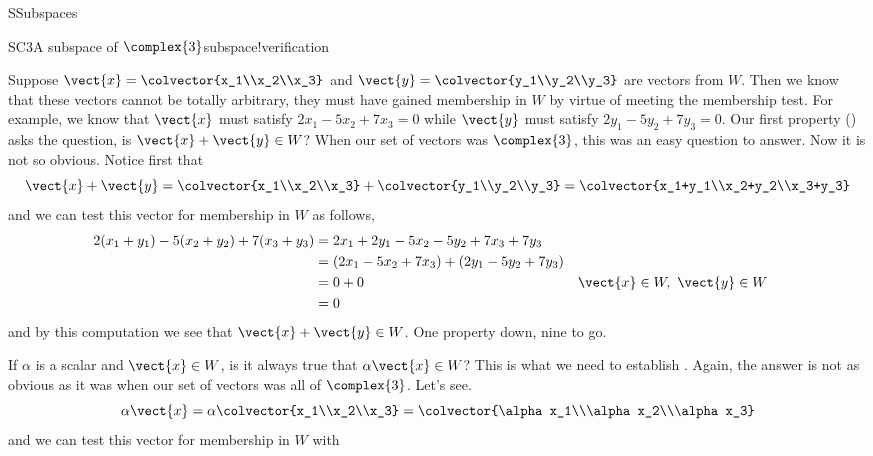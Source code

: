 \begin{subsect}{S}{Subspaces}
\begin{example}{SC3}{A subspace of $\complex{3}$}{subspace!verification}
%
\begin{para}Suppose $\vect{x}=\colvector{x_1\\x_2\\x_3}$ and $\vect{y}=\colvector{y_1\\y_2\\y_3}$ are vectors from $W$.  Then we know that these vectors cannot be totally arbitrary, they must have gained membership in $W$ by virtue of meeting the membership test.  For example, we know that $\vect{x}$ must satisfy $2x_1-5x_2+7x_3=0$ while $\vect{y}$ must satisfy $2y_1-5y_2+7y_3=0$.  Our first property () asks the question, is $\vect{x}+\vect{y}\in W$?  When our set of vectors was $\complex{3}$, this was an easy question to answer.  Now it is not so obvious.  Notice first that
%
\begin{equation*}
\vect{x}+\vect{y}=\colvector{x_1\\x_2\\x_3}+\colvector{y_1\\y_2\\y_3}=
\colvector{x_1+y_1\\x_2+y_2\\x_3+y_3}
\end{equation*}
%
and we can test this vector for membership in $W$ as follows,
\begin{align*}
2(x_1+y_1)-5(x_2+y_2)+7(x_3+y_3)
&=2x_1+2y_1-5x_2-5y_2+7x_3+7y_3\\
&=(2x_1-5x_2+7x_3)+(2y_1-5y_2+7y_3)\\
&=0 + 0&&\vect{x}\in W,\ \vect{y}\in W\\
&=0
\end{align*}
%
and by this computation we see that $\vect{x}+\vect{y}\in W$.  One property down, nine to go.\end{para}
%
\begin{para}If $\alpha$ is a scalar and $\vect{x}\in W$, is it always true that $\alpha\vect{x}\in W$?  This is what we need to establish .  Again, the answer is not as obvious as it was when our set of vectors was all of $\complex{3}$.  Let's see.
%
\begin{equation*}
\alpha\vect{x}=\alpha\colvector{x_1\\x_2\\x_3}=\colvector{\alpha x_1\\\alpha x_2\\\alpha x_3}
\end{equation*}
%
and we can test this vector for membership in $W$ with

\end{para}
\end{example}
\end{subsect}

